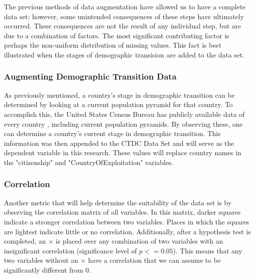 \documentclass{article} %
\begin{document}
The previous methods of data augmentation have allowed us to have a complete data set; however, some unintended consequences of these steps have ultimately occurred. These consequences are not the result of any individual step, but are due to a combination of factors. The most significant contributing factor is perhaps the non-uniform distribution of missing values. This fact is best illustrated when the stages of demographic transision are added to the data set. 

\subsubsection{Augmenting Demographic Transition Data}

As previously mentioned, a country's stage in demographic transition can be determined by looking at a current population pyramid for that country. To accomplish this, the United States Census Bureau has publicly available data of every country \parencite{USCB}, including current population pyramids. By observing these, one can determine a country's current stage in demographic transition. This information was then appended to the CTDC Data Set and will serve as the dependent variable in this research. These values will replace country names in the "citizenship" and "CountryOfExploitation" variables.

\subsubsection{Correlation} \label{Correlation}

Another metric that will help determine the suitability of the data set is by observing the correlation matrix of all variables. In this matrix, darker squares indicate a stronger correlation between two variables. Places in which the squares are lightest indicate little or no correlation. Additionally, after a hypothesis test is completed, an $\times$ is placed over any combination of two variables with an insignificant correlation (significance level of $p <= 0.05$). This means that any two variables without an $\times$ have a correlation that we can assume to be significantly different from 0.
\end{document}

